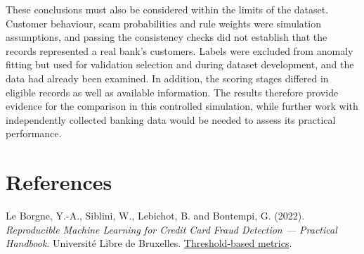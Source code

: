 \documentclass[a4paper,12pt]{article}
\begin{document}
These conclusions must also be considered within the limits of the dataset. Customer behaviour, scam probabilities and rule weights were simulation assumptions, and passing the consistency checks did not establish that the records represented a real bank's customers. Labels were excluded from anomaly fitting but used for validation selection and during dataset development, and the data had already been examined. In addition, the scoring stages differed in eligible records as well as available information. The results therefore provide evidence for the comparison in this controlled simulation, while further work with independently collected banking data would be needed to assess its practical performance.

\FloatBarrier\section*{References}

Le Borgne, Y.-A., Siblini, W., Lebichot, B. and Bontempi, G. (2022). \emph{Reproducible Machine Learning for Credit Card Fraud Detection — Practical Handbook}. Université Libre de Bruxelles. \href{https://fraud-detection-handbook.github.io/fraud-detection-handbook/Chapter\_4\_PerformanceMetrics/ThresholdBased.html}{Threshold-based metrics}.

\end{document}

